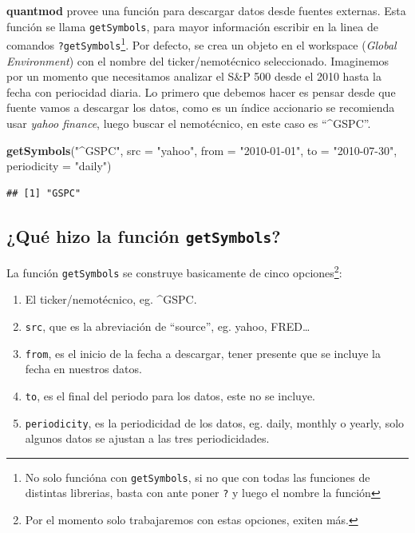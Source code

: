 \documentclass[12pt,]{book}
\newenvironment{Shaded}{\begin{snugshade}}{\end{snugshade}}
\newcommand{\KeywordTok}[1]{\textcolor[rgb]{0.13,0.29,0.53}{\textbf{#1}}}
\newcommand{\DataTypeTok}[1]{\textcolor[rgb]{0.13,0.29,0.53}{#1}}
\newcommand{\StringTok}[1]{\textcolor[rgb]{0.31,0.60,0.02}{#1}}
\newcommand{\NormalTok}[1]{#1}
\providecommand{\tightlist}{%
  \setlength{\itemsep}{0pt}\setlength{\parskip}{0pt}}
\begin{document}
\textbf{quantmod} provee una función para descargar datos desde fuentes
externas. Esta función se llama \texttt{getSymbols}, para mayor
información escribir en la linea de comandos
\texttt{?getSymbols}\footnote{No solo funcióna con \texttt{getSymbols},
  si no que con todas las funciones de distintas librerias, basta con
  ante poner \texttt{?} y luego el nombre la función}. Por defecto, se
crea un objeto en el workspace (\emph{Global Environment}) con el nombre
del ticker/nemotécnico seleccionado. Imaginemos por un momento que
necesitamos analizar el S\&P 500 desde el 2010 hasta la fecha con
periocidad diaria. Lo primero que debemos hacer es pensar desde que
fuente vamos a descargar los datos, como es un índice accionario se
recomienda usar \emph{yahoo finance}, luego buscar el nemotécnico, en
este caso es ``\^{}GSPC''.

\begin{Shaded}
\begin{Highlighting}[]
\KeywordTok{getSymbols}\NormalTok{(}\StringTok{"^GSPC"}\NormalTok{, }\DataTypeTok{src =} \StringTok{"yahoo"}\NormalTok{, }\DataTypeTok{from =} \StringTok{"2010-01-01"}\NormalTok{, }\DataTypeTok{to =} \StringTok{"2010-07-30"}\NormalTok{, }\DataTypeTok{periodicity =} \StringTok{"daily"}\NormalTok{)}
\end{Highlighting}
\end{Shaded}

\begin{verbatim}
## [1] "GSPC"
\end{verbatim}

\subsection{\texorpdfstring{¿Qué hizo la función
\texttt{getSymbols}?}{¿Qué hizo la función getSymbols?}}\label{que-hizo-la-funcion-getsymbols}

La función \texttt{getSymbols} se construye basicamente de cinco
opciones\footnote{Por el momento solo trabajaremos con estas opciones,
  exiten más.}:

\begin{enumerate}
\def\labelenumi{\arabic{enumi}.}
\tightlist
\item
  El ticker/nemotécnico, eg. \^{}GSPC.
\item
  \texttt{src}, que es la abreviación de ``source'', eg. yahoo,
  FRED\ldots{}
\item
  \texttt{from}, es el inicio de la fecha a descargar, tener presente
  que se incluye la fecha en nuestros datos.
\item
  \texttt{to}, es el final del periodo para los datos, este no se
  incluye.
\item
  \texttt{periodicity}, es la periodicidad de los datos, eg. daily,
  monthly o yearly, solo algunos datos se ajustan a las tres
  periodicidades.
\end{enumerate}
\end{document}
